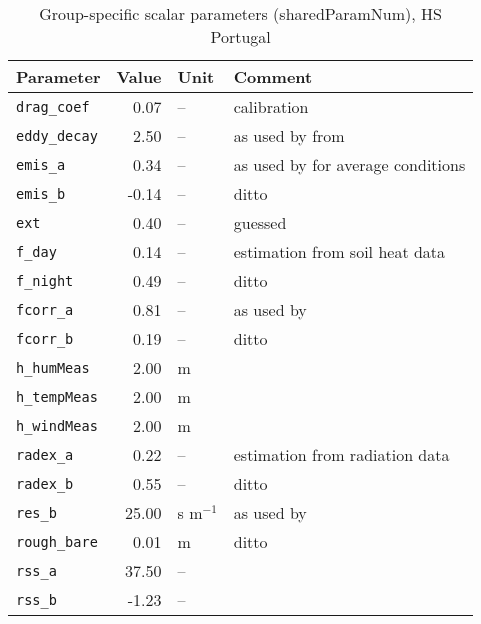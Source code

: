 \begin{table}[ht]
\centering
\caption{Group-specific scalar parameters (\textsf{sharedParamNum}), HS Portugal} 
\label{tab:portugalHS_sharedParamNum}
\begin{tabular}{lrll}
  \hline
Parameter & Value & Unit & Comment \\ 
  \hline
\verb!drag_coef! & 0.07 & -- & calibration \\ 
  \verb!eddy_decay! & 2.50 & -- & as used by \citet{shuttleworth85} from \citet{monteith73} \\ 
  \verb!emis_a! & 0.34 & -- & as used by \citet{maidment93} for average conditions \\ 
  \verb!emis_b! & -0.14 & -- & ditto \\ 
  \verb!ext! & 0.40 & -- & guessed \\ 
  \verb!f_day! & 0.14 & -- & estimation from soil heat data \\ 
  \verb!f_night! & 0.49 & -- & ditto \\ 
  \verb!fcorr_a! & 0.81 & -- & as used by \citet{maidment93} \\ 
  \verb!fcorr_b! & 0.19 & -- & ditto \\ 
  \verb!h_humMeas! & 2.00 & m &  \\ 
  \verb!h_tempMeas! & 2.00 & m &  \\ 
  \verb!h_windMeas! & 2.00 & m &  \\ 
  \verb!radex_a! & 0.22 & -- & estimation from radiation data \\ 
  \verb!radex_b! & 0.55 & -- & ditto \\ 
  \verb!res_b! & 25.00 & s m$^{-1}$ & as used by \citet{shuttleworth85} \\ 
  \verb!rough_bare! & 0.01 & m & ditto \\ 
  \verb!rss_a! & 37.50 & -- &  \\ 
  \verb!rss_b! & -1.23 & -- &  \\ 
   \hline
\end{tabular}
\end{table}
